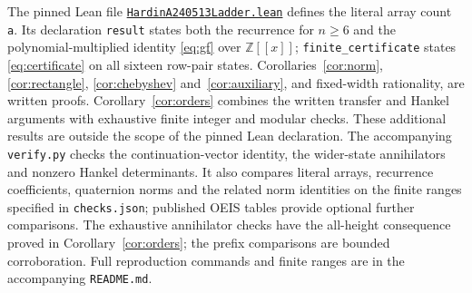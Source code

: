 \documentclass[11pt]{article}
\newcommand{\Z}{\mathbb{Z}}
\begin{document}
\medskip
The pinned Lean file
\href{https://github.com/the-omega-institute/trureturing/blob/70badecc7fca07aa0b70e1202720702f7d1f9670/D5/S3/Combinatorics/TraceAvoidingArrays/HardinA240513Ladder.lean}{\texttt{HardinA240513Ladder.lean}}
\cite{lean} defines the literal array count
\texttt{a}. Its declaration \texttt{result} states both the recurrence
for $n\geq6$ and the
polynomial-multiplied identity \eqref{eq:gf} over $\Z[[x]]$;
\texttt{finite\_certificate} states \eqref{eq:certificate} on all sixteen
row-pair states. Corollaries~\ref{cor:norm}, \ref{cor:rectangle},
\ref{cor:chebyshev} and~\ref{cor:auxiliary}, and fixed-width rationality,
are written proofs. Corollary~\ref{cor:orders} combines the written
transfer and Hankel arguments with exhaustive finite integer and modular
checks. These additional results are outside the
scope of the pinned Lean declaration.
The accompanying \texttt{verify.py} checks the continuation-vector
identity, the wider-state annihilators and nonzero Hankel determinants.
It also compares literal arrays, recurrence coefficients, quaternion
norms and the related norm identities on the finite ranges specified
in \texttt{checks.json}; published OEIS tables provide optional further
comparisons. The exhaustive annihilator checks have the all-height
consequence proved in Corollary~\ref{cor:orders}; the prefix comparisons
are bounded corroboration. Full reproduction commands and finite ranges
are in the accompanying \texttt{README.md}.
\end{document}

